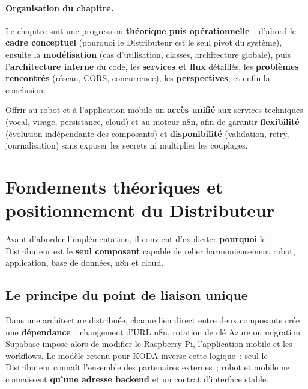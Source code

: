 \documentclass[a4paper,12pt]{report}
\begin{document}
	\paragraph{Organisation du chapitre.}
	Le chapitre suit une progression \textbf{théorique puis opérationnelle}~: d'abord le
	\textbf{cadre conceptuel} (pourquoi le Distributeur est le seul pivot du système),
	ensuite la \textbf{modélisation} (cas d'utilisation, classes, architecture globale),
	puis l'\textbf{architecture interne} du code, les \textbf{services et flux} détaillés,
	les \textbf{problèmes rencontrés} (réseau, CORS, concurrence), les
	\textbf{perspectives}, et enfin la conclusion.
	
	\begin{tcolorbox}[colback=blue!5!white, colframe=blue!60!black,
		title=\textbf{Rôle principal du Distributeur de Services}]
		Offrir au robot et à l'application mobile un \textbf{accès unifié} aux services
		techniques (vocal, visage, persistance, cloud) et au moteur n8n, afin de garantir
		\textbf{flexibilité} (évolution indépendante des composants) et
		\textbf{disponibilité} (validation, retry, journalisation) sans exposer les secrets
		ni multiplier les couplages.
	\end{tcolorbox}
	
	\section{Fondements théoriques et positionnement du Distributeur}
	\label{sec:ch4-fondements}
	
	Avant d'aborder l'implémentation, il convient d'expliciter \textbf{pourquoi} le
	Distributeur est le \textbf{seul composant} capable de relier harmonieusement robot,
	application, base de données, n8n et cloud.
	
	\subsection{Le principe du point de liaison unique}
	
	Dans une architecture distribuée, chaque lien direct entre deux composants crée une
	\textbf{dépendance}~: changement d'URL n8n, rotation de clé Azure ou migration
	Supabase impose alors de modifier le Raspberry Pi, l'application mobile et les
	workflows. Le modèle retenu pour KODA inverse cette logique~: seul le Distributeur
	connaît l'ensemble des partenaires externes~; robot et mobile ne connaissent
	\textbf{qu'une adresse backend} et un contrat d'interface stable.
	
\end{document}
